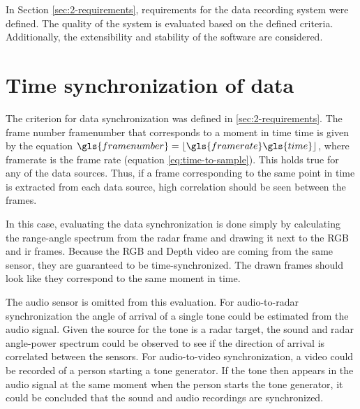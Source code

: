 In Section \ref{sec:2-requirements}, requirements for the data recording system were defined.
The quality of the system is evaluated based on the defined criteria.
Additionally, the extensibility and stability of the software are considered.

\section{Time synchronization of data}
The criterion for data synchronization was defined in \ref{sec:2-requirements}.
The frame number \gls{framenumber} that corresponds to a moment in time \gls{time} is given by the equation $\gls{framenumber} = \lfloor \gls{framerate} \gls{time} \rfloor$,
where \gls{framerate} is the frame rate (equation \ref{eq:time-to-sample}).
This holds true for any of the data sources.
Thus, if a frame corresponding to the same point in time is extracted from each data source,
high correlation should be seen between the frames.

In this case, evaluating the data synchronization is done
simply by calculating the range-angle spectrum from the radar frame and drawing it next to the RGB and \gls{ir} frames.
Because the RGB and Depth video are coming from the same sensor, they are guaranteed to be time-synchronized.
The drawn frames should look like they correspond to the same moment in time.

The audio sensor is omitted from this evaluation.
For audio-to-radar synchronization the angle of arrival of a single tone could be estimated from the audio signal.
Given the source for the tone is a radar target, the sound and radar angle-power spectrum could be observed
to see if the direction of arrival is correlated between the sensors.
For audio-to-video synchronization, a video could be recorded of a person starting a tone generator.
If the tone then appears in the audio signal at the same moment when the person starts the tone generator,
it could be concluded that the sound and audio recordings are synchronized.

